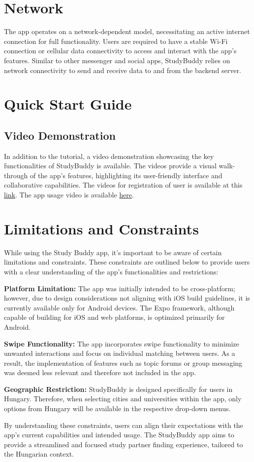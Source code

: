 \section{Network}
The app operates on a network-dependent model, necessitating an active internet connection for full functionality. Users are required to have a stable Wi-Fi connection or cellular data connectivity to access and interact with the app's features. Similar to other messenger and social apps, StudyBuddy relies on network connectivity to send and receive data to and from the backend server.
\section{Quick Start Guide}\label{sec:qsg}
\subsection{Video Demonstration}
 In addition to the tutorial, a video demonstration showcasing the key functionalities of StudyBuddy is available. The videos provide a visual walk-through of the app's features, highlighting its user-friendly interface and collaborative capabilities. The videos for registration of user is available at this \href{https://youtu.be/qcr-2ob2LYc}{link}. The app usage video is available \href{https://youtu.be/TWF3gzYAzlM}{here}.
\section{Limitations and Constraints}\label{sec:constraints}
While using the Study Buddy app, it's important to be aware of certain limitations and constraints. These constraints are outlined below to provide users with a clear understanding of the app's functionalities and restrictions:
\begin{compactenum}
    \item \textbf{Platform Limitation:} The app was initially intended to be cross-platform; however, due to design considerations not aligning with iOS build guidelines, it is currently available only for Android devices. The Expo framework, although capable of building for iOS and web platforms, is optimized primarily for Android.
    \item \textbf{Swipe Functionality:} The app incorporates swipe functionality to minimize unwanted interactions and focus on individual matching between users. As a result, the implementation of features such as topic forums or group messaging was deemed less relevant and therefore not included in the app.
    \item \textbf{Geographic Restriction:} StudyBuddy is designed specifically for users in Hungary. Therefore, when selecting cities and universities within the app, only options from Hungary will be available in the respective drop-down menus. 
\end{compactenum}
\bigskip
By understanding these constraints, users can align their expectations with the app's current capabilities and intended usage. The StudyBuddy app aims to provide a streamlined and focused study partner finding experience, tailored to the Hungarian context.